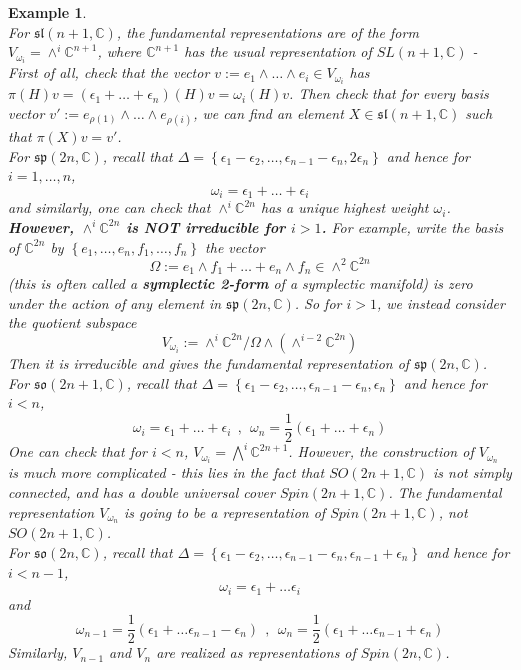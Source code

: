 \documentclass[11pt]{book}
\newtheorem{example}[theorem]{Example}
\newcommand{\bb}[1]{\mathbb{#1}}
\newcommand{\mf}[1]{\mathfrak{#1}}
\begin{document}
\begin{example} \mbox{}\\
For $\mf{sl}(n+1,\bb{C})$, the fundamental representations are of the form $V_{\omega_i} = \wedge^i \bb{C}^{n+1}$, where $\bb{C}^{n+1}$ has the usual representation of $SL(n+1,\bb{C})$ -\\
First of all, check that the vector $v := e_1 \wedge \dots \wedge e_i \in V_{\omega_i}$ has $\pi(H)v = (\epsilon_1 + \dots + \epsilon_n)(H)v = \omega_i(H)v$. Then check that for every basis vector $v' := e_{\rho(1)} \wedge \dots \wedge e_{\rho(i)}$, we can find an element $X \in \mf{sl}(n+1,\bb{C})$ such that $\pi(X)v = v'$.\\

\noindent For $\mf{sp}(2n,\bb{C})$, recall that $\Delta = \left\{ \epsilon_1 - \epsilon_2, \dots, \epsilon_{n-1} - \epsilon_n, 2\epsilon_n\right\}$ and hence for $i =1, \dots, n$,
$$\omega_i = \epsilon_1 + \dots + \epsilon_i$$
and similarly, one can check that $\wedge^i \bb{C}^{2n}$ has a unique highest weight $\omega_i$.\\
\textbf{However, $\wedge^i \bb{C}^{2n}$ is NOT irreducible for $i > 1$.} For example, write the basis of $\bb{C}^{2n}$ by $\left\{e_1, \dots, e_n, f_1, \dots, f_n\right\}$ the vector
$$\Omega := e_1 \wedge f_1 + \dots + e_n \wedge f_n \in \wedge^2 \bb{C}^{2n}$$
(this is often called a \textbf{symplectic 2-form} of a symplectic manifold) is zero under the action of any element in $\mf{sp}(2n,\bb{C})$. So for $i > 1$, we instead consider the quotient subspace
$$V_{\omega_i} := \wedge^i \bb{C}^{2n}/\Omega \wedge (\wedge^{i-2}\bb{C}^{2n})$$
Then it is irreducible and gives the fundamental representation of $\mf{sp}(2n,\bb{C})$.\\

\noindent For $\mf{so}(2n+1,\bb{C})$, recall that $\Delta = \left\{ \epsilon_1 - \epsilon_2, \dots, \epsilon_{n-1} - \epsilon_n, \epsilon_n\right\}$ and hence for $i < n$,
$$\omega_i = \epsilon_1 + \dots + \epsilon_i\ \ ,\ \ \omega_n = \frac{1}{2}(\epsilon_1 + \dots + \epsilon_n)$$
One can check that for $i < n$, $V_{\omega_i} = \bigwedge^i \bb{C}^{2n+1}$. However, the construction of $V_{\omega_n}$ is much more complicated - this lies in the fact that $SO(2n+1,\bb{C})$ is not simply connected, and has a double universal cover $Spin(2n+1,\bb{C})$. The fundamental representation $V_{\omega_n}$ is going to be a representation of $Spin(2n+1,\bb{C})$, not $SO(2n+1,\bb{C})$.\\

\noindent For $\mf{so}(2n,\bb{C})$, recall that $\Delta = \left\{ \epsilon_1 - \epsilon_2, \dots, \epsilon_{n-1} - \epsilon_n, \epsilon_{n-1}+ \epsilon_n\right\}$ and hence for $i < n-1$,
$$\omega_i = \epsilon_1 + \dots \epsilon_i$$
and
$$\omega_{n-1} = \frac{1}{2}(\epsilon_1 + \dots \epsilon_{n-1} - \epsilon_n)\ \ ,\ \ \omega_{n} = \frac{1}{2}(\epsilon_1 + \dots \epsilon_{n-1} + \epsilon_n)$$
Similarly, $V_{n-1}$ and $V_n$ are realized as representations of $Spin(2n,\bb{C})$.
\end{example}
\end{document}
